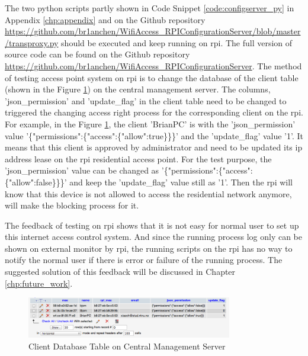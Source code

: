 \par The two python scripts partly shown in Code Snippet \ref{code:configserver_py} in Appendix \ref{chp:appendix} and on the Github repository \url{https://github.com/br1anchen/WifiAccess_RPIConfigurationServer/blob/master/transproxy.py} should be executed and keep running on \gls{rpi}. The full version of source code can be found on the Github repository \url{https://github.com/br1anchen/WifiAccess_RPIConfigurationServer}. The method of testing access point system on \gls{rpi} is to change the database of the client table (shown in the Figure \ref{fig:database_request}) on the central management server. The columns, 'json\_permission' and 'update\_flag' in the client table need to be changed to triggered the changing access right process for the corresponding client on the \gls{rpi}. For example, in the Figure \ref{fig:database_request}, the client 'BrianPC' is with the 'json\_permission' value '\{"permissions":\{"access":\{"allow":true\}\}\}' and the 'update\_flag' value '1'. It means that this client is approved by administrator and need to be updated its \gls{ip} address lease on the \gls{rpi} residential access point. For the test purpose, the 'json\_permission' value can be changed as '\{"permissions":\{"access":\{"allow":false\}\}\}' and keep the 'update\_flag' value still as '1'. Then the \gls{rpi} will know that this device is not allowed to access the residential network anymore, will make the blocking process for it.

\par The feedback of testing on \gls{rpi} shows that it is not easy for normal user to set up this internet access control system. And since the running process log only can be shown on external monitor by \gls{rpi}, the running scripts on the \gls{rpi} has no way to notify the normal user if there is error or failure of the running process. The suggested solution of this feedback will be discussed in Chapter \ref{chp:future_work}.

\begin{figure}
	\centering
    	\includegraphics[width=0.80\textwidth,natwidth=610,natheight=642]{figs/database_request.png}
  	\caption{Client Database Table on Central Management Server}
  	\label{fig:database_request}
\end{figure}

